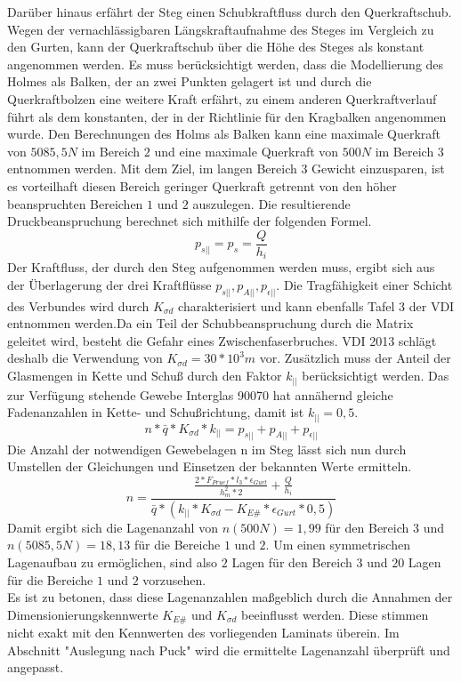 Darüber hinaus erfährt der Steg einen Schubkraftfluss durch den Querkraftschub. Wegen der vernachlässigbaren Längskraftaufnahme des Steges im Vergleich zu den Gurten, kann der Querkraftschub über die Höhe des Steges als konstant angenommen werden. Es muss berücksichtigt werden, dass die Modellierung des Holmes als Balken, der an zwei Punkten gelagert ist und durch die Querkraftbolzen eine weitere Kraft erfährt, zu einem anderen Querkraftverlauf führt als dem konstanten, der in der Richtlinie für den Kragbalken angenommen wurde. Den Berechnungen des Holms als Balken kann eine maximale Querkraft von $ 5085,5N $ im Bereich $ 2 $ und eine maximale Querkraft von $ 500N $ im Bereich $ 3 $ entnommen werden. Mit dem Ziel, im langen Bereich $ 3 $ Gewicht einzusparen, ist es vorteilhaft diesen Bereich geringer Querkraft getrennt von den höher beanspruchten Bereichen $ 1 $ und $ 2 $ auszulegen. Die resultierende Druckbeanspruchung berechnet sich mithilfe der folgenden Formel.
\begin{equation}
	p_{s||}=p_{s}=\frac{Q}{h_{i}}
\end{equation}
Der Kraftfluss, der durch den Steg aufgenommen werden muss, ergibt sich aus der Überlagerung der drei Kraftflüsse $ p_{s||}, p_{A||}, p_{\epsilon||} $. Die Tragfähigkeit einer Schicht des Verbundes wird durch $ K_{\sigma d} $ charakterisiert und kann ebenfalls Tafel 3 der VDI entnommen werden.Da ein Teil der Schubbeanspruchung durch die Matrix geleitet wird, besteht die Gefahr eines Zwischenfaserbruches. VDI 2013 schlägt deshalb die Verwendung von $ K_{\sigma d}=30*10^{3}m $ vor.  Zusätzlich muss der Anteil der Glasmengen in Kette und Schuß durch den Faktor $ k_{||} $ berücksichtigt werden. Das zur Verfügung stehende Gewebe Interglas 90070 hat annähernd gleiche Fadenanzahlen in Kette- und Schußrichtung, damit ist $ k_{||}=0,5 $. 
\begin{equation}
	n*\bar{q}*K_{\sigma d}*k_{||}=p_{s||}+p_{A||}+p_{\epsilon||}
\end{equation}
Die Anzahl der notwendigen Gewebelagen n im Steg lässt sich nun durch Umstellen der Gleichungen und Einsetzen der bekannten Werte ermitteln.\\
\begin{equation}
	n=\frac{\frac{2*F_{Pruef}*l_{3}*\epsilon_{Gurt}}{h_{m}^{2}*2}+\frac{Q}{h_{i}}}{\bar{q}*\left(k_{||}*K_{\sigma d}-K_{E\#}*\epsilon_{Gurt}*0,5\right)}
\end{equation}
Damit ergibt sich die Lagenanzahl von $ n\left(500N\right)=1,99 $ für den Bereich $ 3 $ und $ n\left(5085,5N\right)=18,13 $ für die Bereiche $ 1 $ und $ 2 $. Um einen symmetrischen Lagenaufbau zu ermöglichen, sind also $ 2 $ Lagen für den Bereich $ 3 $ und $ 20 $ Lagen für die Bereiche $ 1 $ und $ 2 $ vorzusehen.\\

\noindent Es ist zu betonen, dass diese Lagenanzahlen maßgeblich durch die Annahmen der Dimensionierungskennwerte $ K_{E\#} $ und $ K_{\sigma d} $ beeinflusst werden. Diese stimmen nicht exakt mit den Kennwerten des vorliegenden Laminats überein. Im Abschnitt "Auslegung nach Puck" wird die ermittelte Lagenanzahl überprüft und angepasst.
